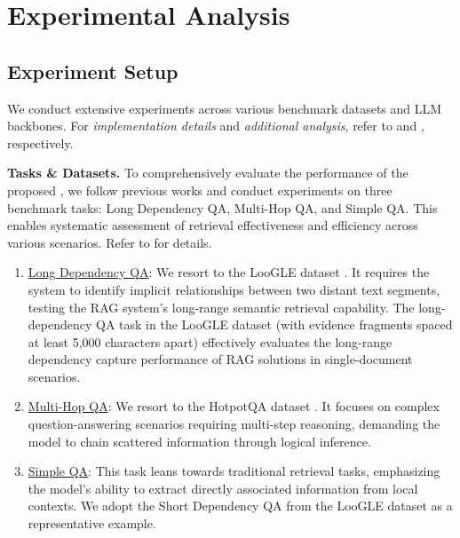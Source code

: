 \section{Experimental Analysis}
\label{sec:evaluation}

\subsection{Experiment Setup}
\label{sec::experiment-setup}

We conduct extensive experiments across various benchmark datasets and LLM backbones. For \textit{implementation details} and \textit{additional analysis}, refer to  and , respectively.

\textbf{Tasks \& Datasets.} To comprehensively evaluate the performance of the proposed \ours, we follow previous works \cite{Main6,Benchmark1} and conduct experiments on three benchmark tasks: Long Dependency QA, Multi-Hop QA, and Simple QA. This enables systematic assessment of retrieval effectiveness and efficiency across various scenarios. Refer to  for details.

\begin{enumerate}[label=\arabic*),leftmargin = 15pt]
\item \uline{Long Dependency QA}: We resort to the LooGLE dataset \cite{Benchmark1}. It requires the system to identify implicit relationships between two distant text segments, testing the RAG system's long-range semantic retrieval capability. The long-dependency QA task in the LooGLE dataset (with evidence fragments spaced at least 5,000 characters apart) effectively evaluates the long-range dependency capture performance of RAG solutions in single-document scenarios.

\item \uline{Multi-Hop QA}: We resort to the HotpotQA dataset \cite{Benchmark2}. It focuses on complex question-answering scenarios requiring multi-step reasoning, demanding the model to chain scattered information through logical inference. 

\item \uline{Simple QA}: This task leans towards traditional retrieval tasks, emphasizing the model's ability to extract directly associated information from local contexts. We adopt the Short Dependency QA from the LooGLE \cite{Benchmark1} dataset as a representative example.
\end{enumerate}


